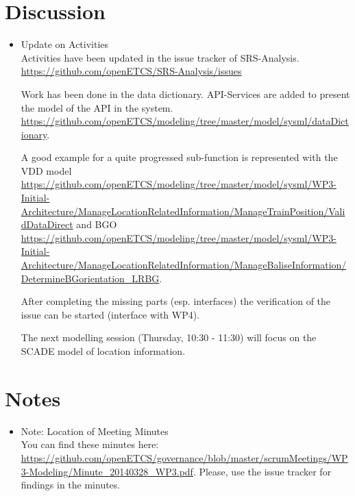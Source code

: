 \documentclass[a4paper, 11pt]{article}
\begin{document}
\section{Discussion}
\begin{itemize}
\item Update on Activities\\

Activities have been updated in the issue tracker of SRS-Analysis. \url{https://github.com/openETCS/SRS-Analysis/issues}

Work has been done in the data dictionary. API-Services are added to present the model of the API  in the system. \url{https://github.com/openETCS/modeling/tree/master/model/sysml/dataDictionary}.

A good example for a quite progressed sub-function is represented with the VDD model \url{https://github.com/openETCS/modeling/tree/master/model/sysml/WP3-Initial-Architecture/ManageLocationRelatedInformation/ManageTrainPosition/ValidDataDirect} and BGO \url{https://github.com/openETCS/modeling/tree/master/model/sysml/WP3-Initial-Architecture/ManageLocationRelatedInformation/ManageBaliseInformation/DetermineBGorientation_LRBG}.

After completing the missing parts (esp. interfaces) the verification of the issue can be started (interface with WP4). 

The next modelling session (Thursday, 10:30 - 11:30) will focus on the SCADE model of location information.

\end{itemize}

\section{Notes}
\begin{itemize}

\item Note: Location of Meeting Minutes\\
You can find these minutes here: \url{https://github.com/openETCS/governance/blob/master/scrumMeetings/WP3-Modeling/Minute_20140328_WP3.pdf}. Please, use the issue tracker for findings in the minutes.

\end{itemize}
\end{document}
